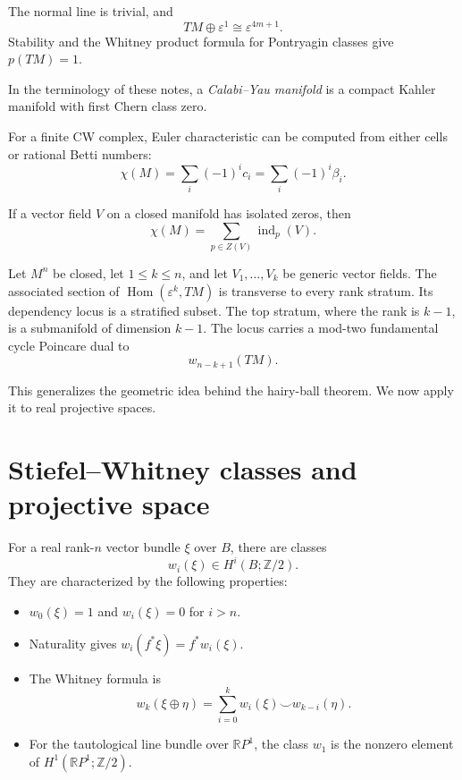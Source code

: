 The normal line is trivial, and
$$
TM\oplus\varepsilon^1
\cong\varepsilon^{4m+1}.
$$
Stability and the Whitney product formula for
Pontryagin classes give $p(TM)=1$.

\begin{definition}
\label{at-definition-calabi-yau}
In the terminology of these notes, a
\emph{Calabi--Yau manifold} is a compact
Kahler manifold with first Chern class zero.
\end{definition}

For a finite CW complex, Euler characteristic
can be computed from either cells or rational
Betti numbers:
$$
\chi(M)=\sum_i(-1)^ic_i
=\sum_i(-1)^i\beta_i.
$$

\begin{theorem}
\label{at-theorem-poincare-hopf}
If a vector field $V$ on a closed manifold
has isolated zeros, then
$$
\chi(M)=\sum_{p\in Z(V)}
\operatorname{ind}_p(V).
$$
\end{theorem}

\begin{theorem}
\label{at-theorem-dependent-fields-locus}
Let $M^n$ be closed, let $1\leq k\leq n$,
and let $V_1,\ldots,V_k$ be generic vector
fields.  The associated section of
$\operatorname{Hom}(\varepsilon^k,TM)$ is
transverse to every rank stratum.  Its
dependency locus is a stratified subset.
The top stratum, where the rank is $k-1$,
is a submanifold of dimension $k-1$.  The
locus carries a mod-two fundamental cycle
Poincare dual to
$$
w_{n-k+1}(TM).
$$
\end{theorem}

This generalizes the geometric idea behind
the hairy-ball theorem.  We now apply it to
real projective spaces.
\section{Stiefel--Whitney classes and
projective space}
\label{section-stiefel-whitney-classes}

For a real rank-$n$ vector bundle $\xi$ over
$B$, there are classes
$$
w_i(\xi)\in H^i(B;\mathbb{Z}/2).
$$
They are characterized by the following
properties:

\begin{itemize}
\item $w_0(\xi)=1$ and $w_i(\xi)=0$ for
$i>n$.

\item Naturality gives
$w_i(f^*\xi)=f^*w_i(\xi)$.

\item The Whitney formula is
$$
w_k(\xi\oplus\eta)=
\sum_{i=0}^k
w_i(\xi)\smile w_{k-i}(\eta).
$$

\item For the tautological line bundle over
$\mathbb{R}P^1$, the class $w_1$ is the
nonzero element of
$H^1(\mathbb{R}P^1;\mathbb{Z}/2)$.
\end{itemize}

